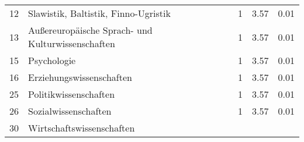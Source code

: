\begin{longtable}{lXrrr}
     12 &
     \multicolumn{1}{X}{ Slawistik, Baltistik, Finno-Ugristik   } &


       \num{1} &
       \num[round-mode=places,round-precision=2]{3,57} &
         \num[round-mode=places,round-precision=2]{0,01} \\

     13 &
     \multicolumn{1}{X}{ Außereuropäische Sprach- und Kulturwissenschaften   } &


       \num{1} &
       \num[round-mode=places,round-precision=2]{3,57} &
         \num[round-mode=places,round-precision=2]{0,01} \\

     15 &
     \multicolumn{1}{X}{ Psychologie   } &


       \num{1} &
       \num[round-mode=places,round-precision=2]{3,57} &
         \num[round-mode=places,round-precision=2]{0,01} \\

     16 &
     \multicolumn{1}{X}{ Erziehungswissenschaften   } &


       \num{1} &
       \num[round-mode=places,round-precision=2]{3,57} &
         \num[round-mode=places,round-precision=2]{0,01} \\

     25 &
     \multicolumn{1}{X}{ Politikwissenschaften   } &


       \num{1} &
       \num[round-mode=places,round-precision=2]{3,57} &
         \num[round-mode=places,round-precision=2]{0,01} \\

     26 &
     \multicolumn{1}{X}{ Sozialwissenschaften   } &


       \num{1} &
       \num[round-mode=places,round-precision=2]{3,57} &
         \num[round-mode=places,round-precision=2]{0,01} \\

     30 &
     \multicolumn{1}{X}{ Wirtschaftswissenschaften   } &



\end{longtable}
